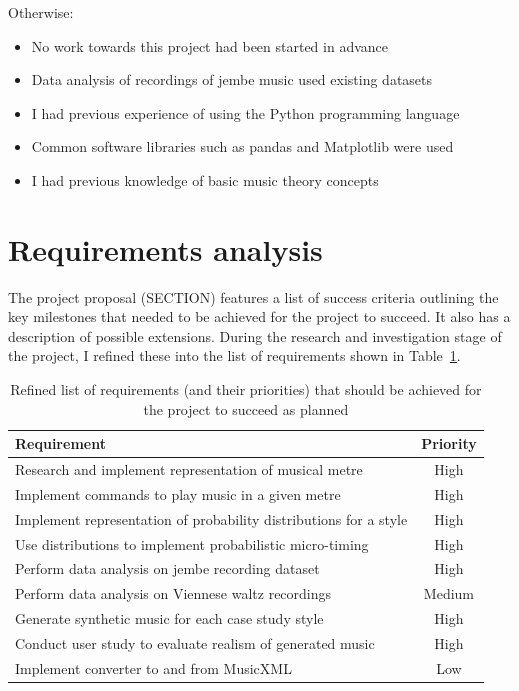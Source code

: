 \documentclass[12pt,twoside,openright]{report}
\begin{document}
Otherwise:
\begin{itemize}
	\item No work towards this project had been started in advance
	\item Data analysis of recordings of jembe music used existing datasets
	\item I had previous experience of using the Python programming language
	\item Common software libraries such as pandas and Matplotlib were used
	\item I had previous knowledge of basic music theory concepts
\end{itemize}



\section{Requirements analysis} \label{requirements_analysis}

The project proposal (SECTION) features a list of success criteria outlining the
key milestones that needed to be achieved for the project to succeed. It also
has a description of possible extensions. During the research and investigation
stage of the project, I refined these into the list of requirements shown in
Table~\ref{table:requirements}.

\begin{table}
\centering
\begin{tabular}{|l|c|}
    \hline
    \textbf{Requirement}                                      & \textbf{Priority} \\
    \hline
    Research and implement representation of musical metre              & High \\
    Implement commands to play music in a given metre                   & High \\
    Implement representation of probability distributions for a style   & High \\
    Use distributions to implement probabilistic micro-timing           & High \\
    Perform data analysis on jembe recording dataset                    & High \\
    Perform data analysis on Viennese waltz recordings                  & Medium \\
    Generate synthetic music for each case study style                  & High \\
    Conduct user study to evaluate realism of generated music           & High \\
    Implement converter to and from MusicXML                            & Low \\
    \hline
\end{tabular}
\caption{Refined list of requirements (and their priorities) that should be achieved for the project to succeed as planned}
\label{table:requirements}
\end{table}
\end{document}
